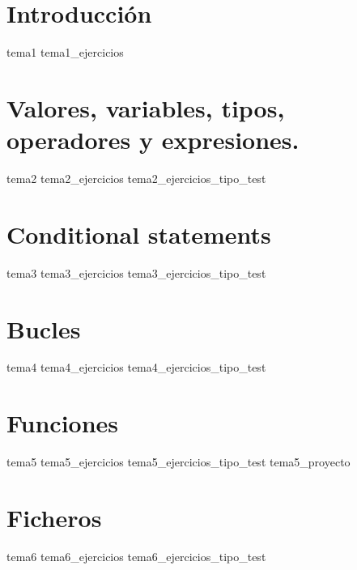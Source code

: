 \documentclass[fontsize=10pt,a4paper]{scrbook}
\begin{document}
\chapter{Introducción}
\minitoc%
{tema1}
{tema1_ejercicios}

\chapter{Valores, variables, tipos, operadores y expresiones.}
\minitoc%
{tema2}
{tema2_ejercicios}
{tema2_ejercicios_tipo_test}

\chapter{Conditional statements}
\minitoc%
{tema3}
{tema3_ejercicios}
{tema3_ejercicios_tipo_test}

\chapter{Bucles}
\minitoc%
{tema4}
{tema4_ejercicios}
{tema4_ejercicios_tipo_test}

\chapter{Funciones}
\minitoc%
{tema5}
{tema5_ejercicios}
{tema5_ejercicios_tipo_test}
{tema5_proyecto}

\chapter{Ficheros}
\minitoc%
{tema6}
{tema6_ejercicios}
{tema6_ejercicios_tipo_test}

\printindex[default]
\newpage
\vspace*{2.0cm}
\thispagestyle{empty}


\end{document}
